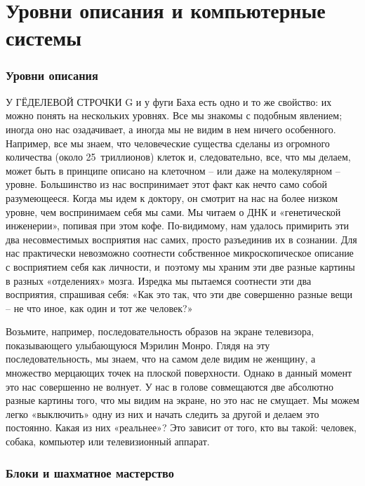 \documentclass[../main.tex]{subfiles}
\begin{document}
\chapter{Уровни описания и компьютерные системы}

\subsection{Уровни описания}

У ГЁДЕЛЕВОЙ СТРОЧКИ G и у фуги Баха есть одно и то же свойство: их можно понять на нескольких уровнях. Все мы знакомы с подобным явлением; иногда оно нас озадачивает, а иногда мы не видим в нем ничего особенного. Например, все мы знаем, что человеческие существа сделаны из огромного количества (около 25~триллионов) клеток и, следовательно, все, что мы делаем, может быть в принципе описано на клеточном \--- или даже на молекулярном \--- уровне. Большинство из нас воспринимает этот факт как нечто само собой разумеющееся. Когда мы идем к доктору, он смотрит на нас на более низком уровне, чем воспринимаем себя мы сами. Мы читаем о ДНК и «генетической инженерии», попивая при этом кофе. По-видимому, нам удалось примирить эти два несовместимых восприятия нас самих, просто разъединив их в сознании. Для нас практически невозможно соотнести собственное микроскопическое описание с восприятием себя как личности, и~поэтому мы храним эти две разные картины в разных «отделениях» мозга. Изредка мы пытаемся соотнести эти два восприятия, спрашивая себя: «Как это так, что эти две совершенно разные вещи \--- не что иное, как один и тот же человек?»

Возьмите, например, последовательность образов на экране телевизора, показывающего улыбающуюся Мэрилин Монро. Глядя на эту последовательность, мы знаем, что на самом деле видим не женщину, а множество мерцающих точек на плоской поверхности. Однако в данный момент это нас совершенно не волнует. У нас в голове совмещаются две абсолютно разные картины того, что мы видим на экране, но это нас не смущает. Мы можем легко «выключить» одну из них и начать следить за другой и делаем это постоянно. Какая из них «реальнее»? Это зависит от того, кто вы такой: человек, собака, компьютер или телевизионный аппарат.


\subsection{Блоки и шахматное мастерство}
\end{document}
